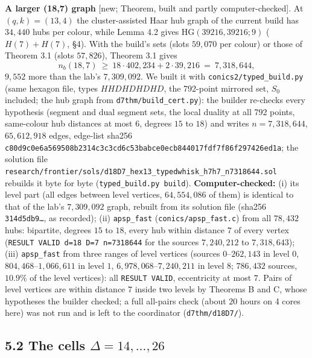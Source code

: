\documentclass[
  10pt,
]{article}
\begin{document}
\textbf{A larger (18,7) graph} {[}new; Theorem, built and partly
computer-checked{]}. At \((q,k)=(13,4)\) the cluster-assisted Haar hub
graph of the current build has \(34{,}440\) hubs per colour, while Lemma
4.2 gives \(\mathrm{HG}(39216,39216;9)\) (\(H(7)+H(7)\), §4). With the
build's sets (slots \(59{,}070\) per colour) or those of Theorem 3.1
(slots \(57{,}826\)), Theorem 3.1 gives
\[n_b(18,7)\ \ge\ 18\cdot402{,}234+2\cdot39{,}216\ =\ 7{,}318{,}644,\]
\(9{,}552\) more than the lab's \(7{,}309{,}092\). We built it with
\texttt{conics2/typed\_build.py} (same hexagon file, types
\(HHDHDHDHD\), the 792-point mirrored set, \(S_0\) included; the hub
graph from \texttt{d7thm/build\_cert.py}): the builder re-checks every
hypothesis (segment and dual segment sets, the local duality at all 792
points, same-colour hub distances at most \(6\), degrees \(15\) to
\(18\)) and writes \(n=7{,}318{,}644\), \(65{,}612{,}918\) edges,
edge-list sha256
\texttt{c80d9c0e6a569508b2314c3c3cd6c53babce0ecb844017fdf7f86f297426ed1a};
the solution file
\texttt{research/frontier/sols/d18D7\_hex13\_typedwhisk\_h7h7\_n7318644.sol}
rebuilds it byte for byte (\texttt{typed\_build.py\ build}).
\textbf{Computer-checked:} (i) its level part (all edges between level
vertices, \(64{,}554{,}086\) of them) is identical to that of the lab's
\(7{,}309{,}092\) graph, rebuilt from its solution file (sha256
\texttt{314d5db9…}, as recorded); (ii) \texttt{apsp\_fast}
(\texttt{conics/apsp\_fast.c}) from all \(78{,}432\) hubs: bipartite,
degrees \(15\) to \(18\), every hub within distance \(7\) of every
vertex (\texttt{RESULT\ VALID\ d=18\ D=7\ n=7318644} for the sources
\(7{,}240{,}212\) to \(7{,}318{,}643\)); (iii) \texttt{apsp\_fast} from
three ranges of level vertices (sources \(0\)--\(262{,}143\) in level
\(0\), \(804{,}468\)--\(1{,}066{,}611\) in level \(1\),
\(6{,}978{,}068\)--\(7{,}240{,}211\) in level \(8\); \(786{,}432\)
sources, \(10.9\%\) of the level vertices): all \texttt{RESULT\ VALID},
eccentricity at most \(7\). Pairs of level vertices are within distance
\(7\) inside two levels by Theorems B and C, whose hypotheses the
builder checked; a full all-pairs check (about \(20\) hours on 4 cores
here) was not run and is left to the coordinator
(\texttt{d7thm/d18D7/}).

\hypertarget{the-cells-delta14dots26}{%
\subsection{\texorpdfstring{5.2 The cells
\(\Delta=14,\dots,26\)}{5.2 The cells \textbackslash Delta=14,\textbackslash dots,26}}\label{the-cells-delta14dots26}}
\end{document}
